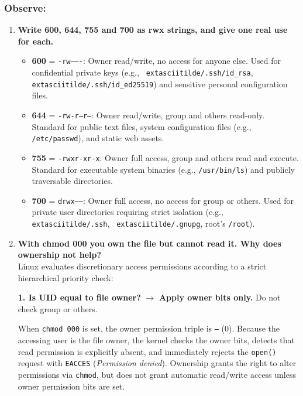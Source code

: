 \documentclass{labreport}
\begin{document}
\subsubsection*{Observe:}
\begin{enumerate}[leftmargin=*]
    \item \textbf{Write 600, 644, 755 and 700 as rwx strings, and give one real use for each.}
    \begin{itemize}[noitemsep, topsep=2pt]
        \item \textbf{600} = \texttt{-rw-------}: Owner read/write, no access for anyone else. Used for confidential private keys (e.g., \texttt{	extasciitilde/.ssh/id\_rsa}, \texttt{	extasciitilde/.ssh/id\_ed25519}) and sensitive personal configuration files.
        \item \textbf{644} = \texttt{-rw-r--r--}: Owner read/write, group and others read-only. Standard for public text files, system configuration files (e.g., \texttt{/etc/passwd}), and static web assets.
        \item \textbf{755} = \texttt{-rwxr-xr-x}: Owner full access, group and others read and execute. Standard for executable system binaries (e.g., \texttt{/usr/bin/ls}) and publicly traversable directories.
        \item \textbf{700} = \texttt{drwx------}: Owner full access, no access for group or others. Used for private user directories requiring strict isolation (e.g., \texttt{	extasciitilde/.ssh}, \texttt{	extasciitilde/.gnupg}, root's \texttt{/root}).
    \end{itemize}

    \item \textbf{With chmod 000 you own the file but cannot read it. Why does ownership not help?}\\[0.2em]
    Linux evaluates discretionary access permissions according to a strict hierarchical priority check:
    \begin{center}
    \textbf{1. Is UID equal to file owner?} $\longrightarrow$ \textbf{Apply owner bits only.} Do not check group or others.
    \end{center}
    When \texttt{chmod 000} is set, the owner permission triple is \texttt{---} (0). Because the accessing user is the file owner, the kernel checks the owner bits, detects that read permission is explicitly absent, and immediately rejects the \texttt{open()} request with \texttt{EACCES} (\textit{Permission denied}). Ownership grants the right to alter permissions via \texttt{chmod}, but does not grant automatic read/write access unless owner permission bits are set.


\end{enumerate}
\end{document}
